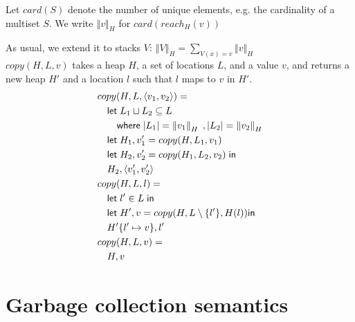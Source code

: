 \documentclass[11pt]{article}
\newcommand{\ssize}[2]{\left\Vert #2 \right\Vert_{#1}}
\newcommand{\card}[1]{card(#1)}
\theoremstyle{definition}
\begin{document}
Let $\card{S}$ denote the number of unique elements, e.g. the cardinality of a multiset $S$.
We write $\ssize{H}{v}$ for $\card{reach_H(v)}$ 

As usual, we extend it to stacks $V$: $\ssize{H}{V} = \sum_{V(x) = v} \ssize{H}{v}$\\

$copy(H,L,v)$ takes a heap $H$, a set of locations $L$, and a value $v$, and returns a new heap $H'$ and a location $l$ such that $l$ maps to $v$ in $H'$.
\begin{align*}
  &copy(H,L,\pairexcst{v_1}{v_2}) =\\
  &\quad\mathsf{let }\; L_1 \sqcup L_2 \subseteq L\\
  &\quad\quad\mathsf{ where }\; |L_1| = \ssize{H}{v_1} \;,|L_2| = \ssize{H}{v_2}\\
  &\quad\mathsf{let }\; H_1,v_1' = copy(H,L_1,v_1) \\
  &\quad\mathsf{let }\; H_2,v_2' = copy(H_1,L_2,v_2) \;\mathsf{in}\\
  &\quad H_2,\pairexcst{v_1'}{v_2'}\\
  &copy(H,L,l) =\\
  &\quad\mathsf{let }\; l' \in L\; \mathsf{in}\\
  &\quad\mathsf{let }\; H',v = copy(H,L \setminus \{l'\}, H(l)) \mathsf{in}\\
  &\quad H'\{l' \mapsto v\}, l'\\
  &copy(H,L,v) = \\
  &\quad H,v
\end{align*}

\section{Garbage collection semantics}
\end{document}
